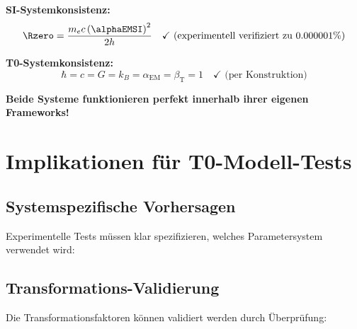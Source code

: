 	\textbf{SI-Systemkonsistenz:}
	$$\Rzero = \frac{m_e c \left(\alphaEMSI\right)^2}{2h} \quad \checkmark \text{ (experimentell verifiziert zu 0.000001\%)}$$
	
	\textbf{T0-Systemkonsistenz:}
	$$\hbar = c = G = k_B = \alpha_{\text{EM}} = \beta_{\text{T}} = 1 \quad \checkmark \text{ (per Konstruktion)}$$
	
	\textbf{Beide Systeme funktionieren perfekt innerhalb ihrer eigenen Frameworks!}
	
	\section{Implikationen für T0-Modell-Tests}
	\label{sec:test_implikationen}
	
	\subsection{Systemspezifische Vorhersagen}
	\label{subsec:systemspezifische_vorhersagen}
	
	Experimentelle Tests müssen klar spezifizieren, welches Parametersystem verwendet wird:
	
	\begin{table}[htbp]
		\centering
		\caption{Systemspezifische experimentelle Vorhersagen}
		\label{tab:system_vorhersagen}
	\end{table}
	
	\subsection{Transformations-Validierung}
	\label{subsec:transformations_validierung}
	
	Die Transformationsfaktoren können validiert werden durch Überprüfung:
	
